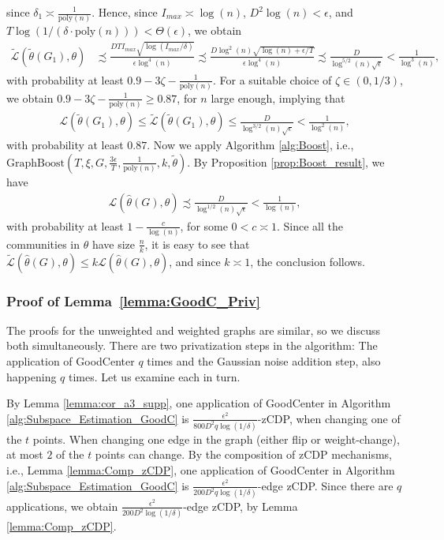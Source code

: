 \documentclass{article}
\newcommand{\thetahat}{\ensuremath{\widehat{\theta}}}
\begin{document}
since $\delta_1 \asymp \frac{1}{\mathrm{poly}(n)}$. Hence, since $I_{max} \asymp \log(n)$, $D^2\log(n) < \epsilon$, and $T\log(1/(\delta\cdot\mathrm{poly}(n))) < \Theta(\epsilon)$, we obtain
\begin{align*}
\widetilde{\mathcal{L}}\left(\widetilde{\theta}(G_1), \theta\right) & \precsim \frac{DTI_{max}\sqrt{\log(I_{max}/\delta)}}{\epsilon\log^4(n)} \precsim \frac{D\log^2(n)\sqrt{\log(n) + \epsilon/T}}{\epsilon\log^4(n)} \precsim \frac{D}{\log^{5/2}(n)\sqrt{\epsilon}} < \frac{1}{\log^3(n)},
\end{align*}
with probability at least $0.9 - 3\zeta - \frac{1}{\mathrm{poly}(n)}$. For a suitable choice of $\zeta \in (0, 1/3)$, we obtain $0.9 - 3\zeta - \frac{1}{\mathrm{poly}(n)} \geq 0.87$, for $n$ large enough, implying that
\begin{align*}
\mathcal{L}\left(\widetilde{\theta}(G_1), \theta\right) \leq \widetilde{\mathcal{L}}\left(\widetilde{\theta}(G_1), \theta\right) \leq \frac{D}{\log^{3/2}(n)\sqrt{\epsilon}} < \frac{1}{\log^2(n)},
\end{align*}
with probability at least $0.87$. Now we apply Algorithm \ref{alg:Boost}, i.e., $\mathrm{GraphBoost}\left(T, \xi, G, \frac{3\epsilon}{T}, \frac{1}{\mathrm{poly}(n)}, k, \widetilde{\theta}\right)$. By Proposition \ref{prop:Boost_result}, we have
\begin{align*}
\mathcal{L}\left(\thetahat(G), \theta\right) \precsim \frac{D}{\log^{1/2}(n)\sqrt{\epsilon}} < \frac{1}{\log(n)},
\end{align*}
with probability at least $1 - \frac{c}{\log(n)}$, for some $0 < c \asymp 1$. Since all the communities in $\theta$ have size $\frac{n}{k}$, it is easy to see that $\widetilde{\mathcal{L}}\left(\thetahat(G), \theta\right) \leq k\mathcal{L}\left(\thetahat(G), \theta\right)$, and since $k \asymp 1$, the conclusion follows. 

\subsubsection{Proof of Lemma~\ref{lemma:GoodC_Priv}}
\label{AppLemGoodC}

The proofs for the unweighted and weighted graphs are similar, so we discuss both simultaneously. There are two privatization steps in the algorithm: The application of GoodCenter $q$ times and the Gaussian noise addition step, also happening $q$ times. Let us examine each in turn. 

By Lemma \ref{lemma:cor_a3_supp}, one application of GoodCenter in Algorithm \ref{alg:Subspace_Estimation_GoodC} is $\frac{\epsilon^2}{800D^2q\log(1/\delta)}$-zCDP, when changing one of the $t$ points. When changing one edge in the graph (either flip or weight-change), at most $2$ of the $t$ points can change. By the composition of zCDP mechanisms, i.e., Lemma \ref{lemma:Comp_zCDP}, one application of GoodCenter in Algorithm \ref{alg:Subspace_Estimation_GoodC} is $\frac{\epsilon^2}{200D^2q\log(1/\delta)}$-edge zCDP. Since there are $q$ applications, we obtain $\frac{\epsilon^2}{200D^2\log(1/\delta)}$-edge zCDP, by Lemma \ref{lemma:Comp_zCDP}.
\end{document}
